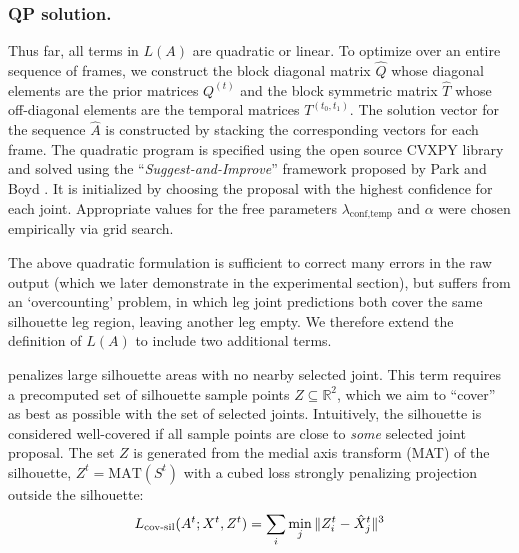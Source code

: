 \subsubsection*{QP solution.}
Thus far, all terms in $L(A)$ are quadratic or linear.
To optimize over an entire sequence of frames, we construct the block diagonal matrix $\hat{Q}$ whose diagonal elements are the prior matrices $Q^{(t)}$ and the block symmetric matrix $\hat{T}$ whose off-diagonal elements are the temporal matrices $T^{(t_0, t_1)}$. The solution vector for the sequence $\hat{A}$ is constructed by stacking the corresponding vectors for each frame. The quadratic program is specified using the open source CVXPY library \cite{diamond2016cvxpy} and solved using the ``\emph{Suggest-and-Improve}'' framework proposed by Park and Boyd \cite{park2017general}. It is initialized by choosing the proposal with the highest confidence for each joint. Appropriate values for the free parameters $\lambda_{\text{conf}, \text{temp}}$ and $\alpha$ were chosen empirically via grid search. 

The above quadratic formulation is sufficient to correct many errors in the raw output (which we later demonstrate in the experimental section), but suffers from an `overcounting' problem, in which leg joint predictions both cover the same silhouette leg region, leaving another leg empty. We therefore extend the definition of $L(A)$ to include two additional terms. 

\def\silhouette{S}

 penalizes large silhouette areas with no nearby selected joint. This term requires a precomputed set of silhouette sample points $Z \subseteq \mathbb{R}^2$, which we aim to ``cover'' as best as possible with the set of selected joints. Intuitively, the silhouette is considered well-covered if all sample points are close to \emph{some} selected joint proposal. The set $Z$ is generated from the medial axis transform (MAT)\cite{blum1967transformation} of the silhouette, $Z^{t} = \text{MAT}(\silhouette^{t})$
with a cubed loss strongly penalizing projection outside the silhouette:
\begin{equation}
L_{\text{cov-sil}}(A^{t};X^{t},Z^{t}) = \sum_{i}\min_{j}\|Z_{i}^{t} - \hat{X}_{j}^{t}\|^3
\end{equation}

